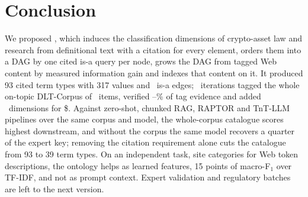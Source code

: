 \section{Conclusion}
\label{sec:conclusion}

We proposed \sys, which induces the classification dimensions of crypto-asset
law and research from definitional text with a citation for every element,
orders them into a DAG by one cited is-a query per node, grows the DAG from
tagged Web content by measured information gain and indexes that content on
it. It produced 93 cited term types with 317 values and \BEdges\ is-a
edges; \NIterWord\ iterations tagged the whole
on-topic DLT-Corpus of \AllItems\ items, verified \EvidMin--\EvidMax\% of tag
evidence and added \AllAddedTypes\ dimensions for \$\AllCost. Against
zero-shot, chunked RAG, RAPTOR and TnT-LLM pipelines over the same corpus and
model, the whole-corpus catalogue scores highest downstream, and without the
corpus the same model recovers a quarter of the expert key; removing the
citation requirement alone cuts the catalogue from 93 to 39 term types. On
an independent task, site categories for Web token descriptions, the
ontology helps as learned features, 15 points of macro-F$_1$ over TF-IDF,
and not as prompt context. Expert validation and regulatory batches are left to the next version.
